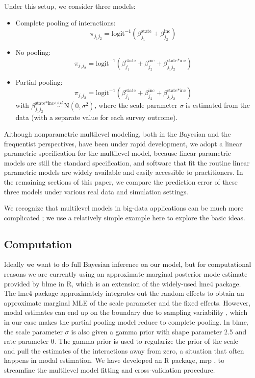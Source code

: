 \documentclass[sii]{ipart}
\begin{document}
Under this setup, we consider three models:
\begin{itemize}
\item Complete pooling of interactions:
\[    \pi_{j_1j_2}=\text{logit}^{-1}\left(\beta^{\text{state}}_{j_1}+\beta^{\text{inc}}_{j_2}\right)\]
\item
  No pooling:
\[    \pi_{j_1j_2}=\text{logit}^{-1}\left(\beta^{\text{state}}_{j_1}+\beta^{\text{inc}}_{j_2}+\beta^{\text{state*inc}}_{j_1j_2}\right)\]

\item
  Partial pooling:
   \[ \pi_{j_1j_2}=\text{logit}^{-1}\left(\beta^{\text{state}}_{j_1}+\beta^{\text{inc}}_{j_2}+\beta^{\text{state*inc}}_{j_1j_2}\right)\] with
    $\beta^{\text{state*inc}}_{j_1j_2}\stackrel{i.i.d.}{\sim} \mbox{N}(0,\sigma^2)$,
    where the scale parameter $\sigma$ is estimated from the data (with a separate value for each survey outcome).
\end{itemize}
Although nonparametric multilevel modeling, both in the Bayesian
\citep{hjort2010bayesian} and the frequentist \citep{ruppert2003semiparametric}
perspectives, have been under rapid development, we adopt a linear parametric
specification for the multilevel model, because linear parametric models are
still the standard specification, and software that fit the routine linear
parametric models are widely available and easily accessible to
practitioners.  In the remaining sections of this paper, we compare the
prediction error of these three models under various real data and simulation
settings.

We recognize that multilevel models in big-data applications can be much more
complicated \citep[see][ for example]{ghitza_2013}; we use a relatively simple example here to explore the basic ideas.

\subsection{Computation}
Ideally we want to do full Bayesian inference on our model, but for computational
reasons we are currently using an approximate marginal posterior mode estimate
provided by blme \citep{blme} in R, which is an extension of the widely-used lme4
\citep{lme4} package. The lme4 package approximately integrates out the random
effects to obtain an approximate marginal MLE of the scale parameter and the
fixed effects. However, modal estimates can end up on the boundary due to
sampling variability \citep{chung2013nondegenerate}, which in our case makes the
partial pooling model reduce to complete pooling. In blme, the scale parameter
$\sigma$ is also given a gamma prior with shape parameter 2.5 and rate parameter
0. The gamma prior is used to regularize the prior of the scale and pull the
estimates of the interactions away from zero, a situation that often happens in
modal estimation. We have developed an R package, mrp \citep{mrp}, to streamline
the multilevel model fitting and cross-validation procedure.
\end{document}
